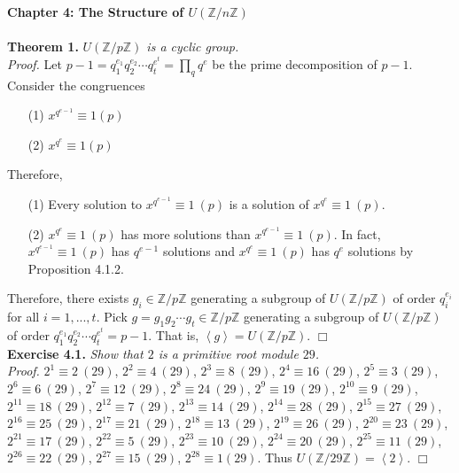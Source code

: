 \documentclass{article}
\begin{document}
\textbf{\Large Chapter 4: The Structure of $U(\mathbb{Z}/n\mathbb{Z})$} \\\\



\textbf{Theorem 1.} \emph{$U(\mathbb{Z}/p\mathbb{Z})$ is a cyclic group.} \\

\emph{Proof.}
Let $p - 1 = q_1^{e_1} q_2^{e_2} \cdots q_t^{e^t} = \prod_{q} q^e$ be the prime
decomposition of $p - 1$. Consider the congruences

\begin{enumerate}
\item[(1)]
$x^{q^{e-1}} \equiv 1 (p)$
\item[(2)]
$x^{q^{e}} \equiv 1 (p)$
\end{enumerate}

Therefore,

\begin{enumerate}
\item[(1)]
Every solution to $x^{q^{e-1}} \equiv 1 \: (p)$ is a solution of $x^{q^{e}} \equiv 1 \: (p)$.
\item[(2)]
$x^{q^{e}} \equiv 1 \: (p)$ has more solutions than $x^{q^{e-1}} \equiv 1 \: (p)$.
In fact, $x^{q^{e-1}} \equiv 1 \: (p)$ has $q^{e-1}$ solutions and $x^{q^{e}} \equiv 1 \: (p)$
has $q^{e}$ solutions by Proposition 4.1.2.
\end{enumerate}

Therefore, there exists $g_i \in \mathbb{Z}/p\mathbb{Z}$ generating a subgroup of
$U(\mathbb{Z}/p\mathbb{Z})$ of order $q_i^{e_i}$ for all $i = 1, ..., t$.
Pick $g = g_1 g_2 \cdots g_t \in \mathbb{Z}/p\mathbb{Z}$ generating a subgroup of
$U(\mathbb{Z}/p\mathbb{Z})$ of order $q_1^{e_1} q_2^{e_2} \cdots q_t^{e^t} = p - 1$.
That is, $\left \langle g \right \rangle = U(\mathbb{Z}/p\mathbb{Z})$.
$\Box$ \\



\textbf{Exercise 4.1.} \emph{Show that $2$ is a primitive root module $29$.}\\

\emph{Proof.}
$2^1 \equiv 2 \: (29)$,
$2^2 \equiv 4 \: (29)$,
$2^3 \equiv 8 \: (29)$,
$2^4 \equiv 16 \: (29)$,
$2^5 \equiv 3 \: (29)$,
$2^6 \equiv 6 \: (29)$,
$2^7 \equiv 12 \: (29)$,
$2^8 \equiv 24 \: (29)$,
$2^9 \equiv 19 \: (29)$,
$2^{10} \equiv 9 \: (29)$,
$2^{11} \equiv 18 \: (29)$,
$2^{12} \equiv 7 \: (29)$,
$2^{13} \equiv 14 \: (29)$,
$2^{14} \equiv 28 \: (29)$,
$2^{15} \equiv 27 \: (29)$,
$2^{16} \equiv 25 \: (29)$,
$2^{17} \equiv 21 \: (29)$,
$2^{18} \equiv 13 \: (29)$,
$2^{19} \equiv 26 \: (29)$,
$2^{20} \equiv 23 \: (29)$,
$2^{21} \equiv 17 \: (29)$,
$2^{22} \equiv 5 \: (29)$,
$2^{23} \equiv 10 \: (29)$,
$2^{24} \equiv 20 \: (29)$,
$2^{25} \equiv 11 \: (29)$,
$2^{26} \equiv 22 \: (29)$,
$2^{27} \equiv 15 \: (29)$,
$2^{28} \equiv 1 (29)$. Thus
$U(\mathbb{Z}/29\mathbb{Z}) = \left \langle 2 \right \rangle$.
$\Box$ \\
\end{document}
